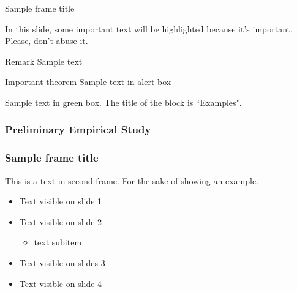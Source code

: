 \documentclass[13pt,aspectratio=169,t,xcolor=table]{beamer}
\begin{document}
\begin{frame}{Sample frame title}
    
    In this slide, some important text will be
    \alert{highlighted} because it's important. Please, don't abuse it.
    
    \begin{block}{Remark}
        Sample text
    \end{block}
    
    \begin{alertblock}{Important theorem}
        Sample text in alert box
    \end{alertblock}
    
    \begin{examples}
        Sample text in green box. The title of the block is ``Examples".
    \end{examples}
    
\end{frame}




\begin{frame}{}
    \frametitle{Preliminary Empirical Study}
\end{frame}



\begin{frame}
    \frametitle{Sample frame title}
    This is a text in second frame. For the sake of showing an example.
    
    \begin{itemize}
        \item<1-> Text visible on slide 1
        \item<2-> Text visible on slide 2
        \begin{itemize}
            \item text subitem
        \end{itemize}
        \item<3> Text visible on slides 3
        \item<4-> Text visible on slide 4
    \end{itemize}
\end{frame}

\titlepage
\end{document}
